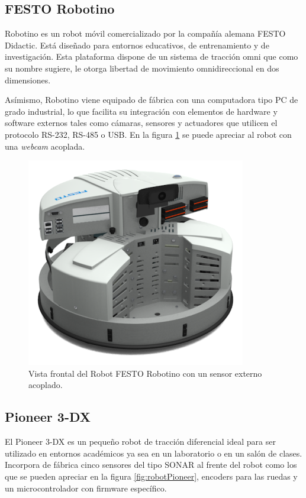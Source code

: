 \subsection{FESTO Robotino}

Robotino es un robot móvil comercializado por la compañía alemana FESTO Didactic. Está diseñado para entornos educativos, de entrenamiento y de investigación.
Esta plataforma dispone de un sistema de tracción omni que como su nombre sugiere, le otorga libertad de movimiento omnidireccional en dos dimensiones.

Asímismo, Robotino viene equipado de fábrica con una computadora tipo PC de grado industrial, lo que facilita su integración con elementos de hardware y software externos tales como cámaras, sensores y actuadores que utilicen el protocolo RS-232, RS-485 o USB. En la figura \ref{fig:robotRobotino} se puede apreciar al robot con una \textit{webcam} acoplada.

\begin{figure}[ht]
	\centering
	\includegraphics[scale=1.4]{./Figures/robotino.png}
	\caption{Vista frontal del Robot FESTO Robotino con un sensor externo acoplado.\protect\footnotemark}
	\label{fig:robotRobotino}
\end{figure}



\subsection{Pioneer 3-DX}

El Pioneer 3-DX es un pequeño robot de tracción diferencial ideal para ser utilizado en entornos académicos ya sea en un laboratorio o en un salón de clases. Incorpora de fábrica cinco sensores del tipo SONAR al frente del robot como los que se pueden apreciar en la figura \ref{fig:robotPioneer}, encoders para las ruedas y un microcontrolador con firmware específico.


